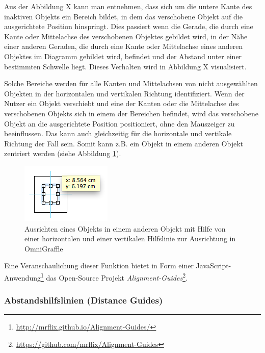 
Aus der Abbildung X kann man entnehmen, dass sich um die untere Kante des inaktiven Objekts ein Bereich bildet, in dem das verschobene Objekt auf die ausgerichtete Position hinspringt. Dies passiert wenn die Gerade, die durch eine Kante oder Mittelachse des verschobenen Objektes gebildet wird, in der Nähe einer anderen Geraden, die durch eine Kante oder Mittelachse eines anderen Objektes im Diagramm gebildet wird, befindet und der Abstand unter einer bestimmten Schwelle liegt. Dieses Verhalten wird in Abbildung X visualisiert.


Solche Bereiche werden für alle Kanten und Mittelachsen von nicht ausgewählten Objekten in der horizontalen und vertikalen Richtung identifiziert. Wenn der Nutzer ein Objekt verschiebt und eine der Kanten oder die Mittelachse des verschobenen Objekts sich in einem der Bereichen befindet, wird das verschobene Objekt an die ausgerichtete Position positioniert, ohne den Mauszeiger zu beeinflussen. Das kann auch gleichzeitig für die horizontale und vertikale Richtung der Fall sein. Somit kann z.B. ein Objekt in einem anderen Objekt zentriert werden (siehe Abbildung \ref{fig:omnigraffle-alignment-guides-centering}).

\begin{figure}[hbt]
    \centering
    \includegraphics{resources/omnigraffle-alignment-guides-centering.png}
    \caption{Ausrichten eines Objekts in einem anderen Objekt mit Hilfe von einer horizontalen und einer vertikalen Hilfslinie zur Ausrichtung in OmniGraffle}
    \label{fig:omnigraffle-alignment-guides-centering}
\end{figure}

Eine Veranschaulichung dieser Funktion bietet in Form einer JavaScript-Anwendung\footnote{\url{http://mrflix.github.io/Alignment-Guides/}} das Open-Source Projekt \textit{Alignment-Guides}\footnote{\url{https://github.com/mrflix/Alignment-Guides}}.

\subsubsection{Abstandshilfslinien (Distance Guides)}

